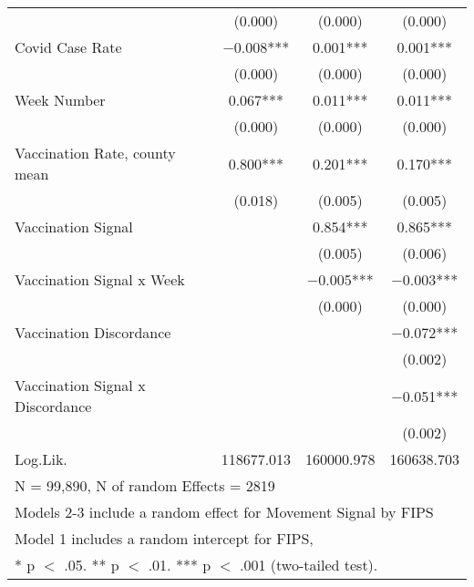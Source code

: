 \begin{table}[!h]
\begin{tabular}[t]{lccc}
 & (\num{0.000}) & (\num{0.000}) & \vphantom{2} (\num{0.000})\\
Covid Case Rate & \num{-0.008}*** & \num{0.001}*** & \num{0.001}***\\
 & (\num{0.000}) & (\num{0.000}) & \vphantom{1} (\num{0.000})\\
Week Number & \num{0.067}*** & \num{0.011}*** & \num{0.011}***\\
 & (\num{0.000}) & (\num{0.000}) & (\num{0.000})\\
Vaccination Rate, county mean & \num{0.800}*** & \num{0.201}*** & \num{0.170}***\\
 & (\num{0.018}) & (\num{0.005}) & (\num{0.005})\\
Vaccination Signal &  & \num{0.854}*** & \num{0.865}***\\
 &  & (\num{0.005}) & (\num{0.006})\\
Vaccination Signal x Week &  & \num{-0.005}*** & \num{-0.003}***\\
 &  & (\num{0.000}) & (\num{0.000})\\
Vaccination Discordance &  &  & \num{-0.072}***\\
 &  &  & \vphantom{1} (\num{0.002})\\
Vaccination Signal x Discordance &  &  & \num{-0.051}***\\
 &  &  & (\num{0.002})\\
\midrule
Log.Lik. & \num{118677.013} & \num{160000.978} & \num{160638.703}\\
\bottomrule
\multicolumn{4}{l}{\rule{0pt}{1em}N = 99,890, N of random Effects = 2819}\\
\multicolumn{4}{l}{\rule{0pt}{1em}Models 2-3 include a random effect for Movement Signal by FIPS}\\
\multicolumn{4}{l}{\rule{0pt}{1em}Model 1 includes a random intercept for FIPS,}\\
\multicolumn{4}{l}{\rule{0pt}{1em}* p $<$ .05. ** p $<$ .01. *** p $<$ .001 (two-tailed test).}\\
\end{tabular}
\end{table}

